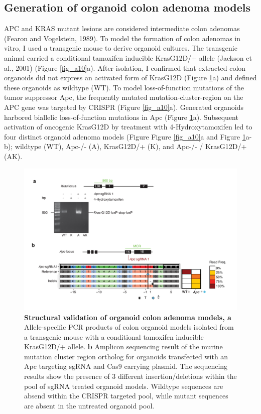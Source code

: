 \begin{flushleft}
\section{Generation of organoid colon adenoma models}

APC and KRAS mutant lesions are considered intermediate colon adenomas (Fearon and Vogelstein, 1989). To model the formation of colon adenomas in vitro, I used a transgenic mouse to derive organoid cultures. The transgenic animal carried a conditional tamoxifen inducible KrasG12D/+ allele (Jackson et al., 2001) (Figure \ref{fig_a10}a). After isolation, I confirmed that extracted colon organoids did not express an activated form of KrasG12D (Figure \ref{fig_a11}a) and defined these organoids as wildtype (WT). To model loss-of-function mutations of the tumor suppressor Apc, the frequently mutated mutation-cluster-region on the APC gene was targeted by CRISPR (Figure \ref{fig_a10}a). Generated organoids harbored biallelic loss-of-function mutations in Apc (Figure \ref{fig_a11}a). Subsequent activation of oncogenic KrasG12D by treatment with 4-Hydroxytamoxifen led to four distinct organoid adenoma models (Figure Figure \ref{fig_a10}a and Figure \ref{fig_a11}a-b); wildtype (WT), Apc-/- (A), KrasG12D/+ (K), and Apc-/- / KrasG12D/+ (AK).


\begin{figure}[h]
\centering
\includegraphics[width=\textwidth,
                height=\textheight,
                keepaspectratio]{figures/adenomaprofiling/pdf/fig_1_1.pdf}
\caption{\textbf{Structural validation of organoid colon adenoma models, a} Allele-specific PCR products of colon organoid models isolated from a transgenic mouse with a conditional tamoxifen inducible KrasG12D/+ allele.
\textbf{b} Amplicon sequencing result of the murine mutation cluster region ortholog for organoids transfected with an Apc targeting sgRNA and Cas9 carrying plasmid. The sequencing results show the presence of 3 different insertion/deletions within the pool of sgRNA treated organoid models. Wildtype sequences are absend within the CRISPR targeted pool, while mutant sequences are absent in the untreated organoid pool.}
\label{fig_a11}
\end{figure}
\bigbreak


\end{flushleft}
